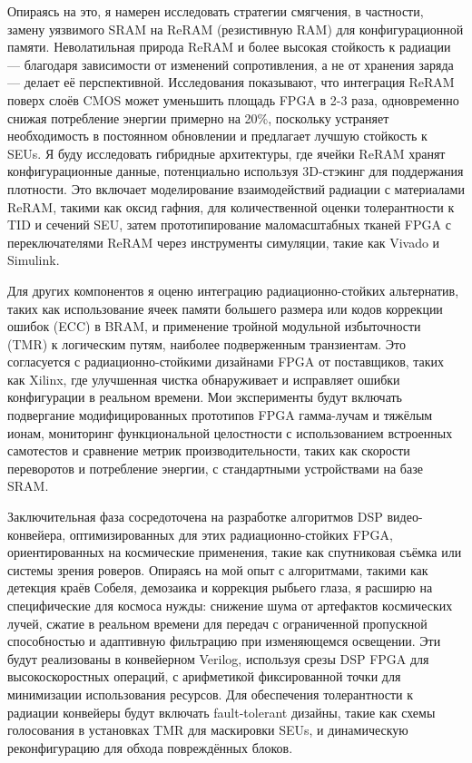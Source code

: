 \documentclass[a4paper,11pt]{article}
\begin{document}
\vspace{10pt}

Опираясь на это, я намерен исследовать стратегии смягчения, в частности, замену уязвимого SRAM на ReRAM (резистивную RAM) для конфигурационной памяти. Неволатильная природа ReRAM и более высокая стойкость к радиации — благодаря зависимости от изменений сопротивления, а не от хранения заряда — делает её перспективной. Исследования показывают, что интеграция ReRAM поверх слоёв CMOS может уменьшить площадь FPGA в 2-3 раза, одновременно снижая потребление энергии примерно на 20\%, поскольку устраняет необходимость в постоянном обновлении и предлагает лучшую стойкость к SEUs. Я буду исследовать гибридные архитектуры, где ячейки ReRAM хранят конфигурационные данные, потенциально используя 3D-стэкинг для поддержания плотности. Это включает моделирование взаимодействий радиации с материалами ReRAM, такими как оксид гафния, для количественной оценки толерантности к TID и сечений SEU, затем прототипирование маломасштабных тканей FPGA с переключателями ReRAM через инструменты симуляции, такие как Vivado и Simulink.

\vspace{10pt}

Для других компонентов я оценю интеграцию радиационно-стойких альтернатив, таких как использование ячеек памяти большего размера или кодов коррекции ошибок (ECC) в BRAM, и применение тройной модульной избыточности (TMR) к логическим путям, наиболее подверженным транзиентам. Это согласуется с радиационно-стойкими дизайнами FPGA от поставщиков, таких как Xilinx, где улучшенная чистка обнаруживает и исправляет ошибки конфигурации в реальном времени. Мои эксперименты будут включать подвергание модифицированных прототипов FPGA гамма-лучам и тяжёлым ионам, мониторинг функциональной целостности с использованием встроенных самотестов и сравнение метрик производительности, таких как скорости переворотов и потребление энергии, с стандартными устройствами на базе SRAM.

\vspace{10pt}

Заключительная фаза сосредоточена на разработке алгоритмов DSP видео-конвейера, оптимизированных для этих радиационно-стойких FPGA, ориентированных на космические применения, такие как спутниковая съёмка или системы зрения роверов. Опираясь на мой опыт с алгоритмами, такими как детекция краёв Собеля, демозаика и коррекция рыбьего глаза, я расширю на специфические для космоса нужды: снижение шума от артефактов космических лучей, сжатие в реальном времени для передач с ограниченной пропускной способностью и адаптивную фильтрацию при изменяющемся освещении. Эти будут реализованы в конвейерном Verilog, используя срезы DSP FPGA для высокоскоростных операций, с арифметикой фиксированной точки для минимизации использования ресурсов. Для обеспечения толерантности к радиации конвейеры будут включать fault-tolerant дизайны, такие как схемы голосования в установках TMR для маскировки SEUs, и динамическую реконфигурацию для обхода повреждённых блоков.
\end{document}
